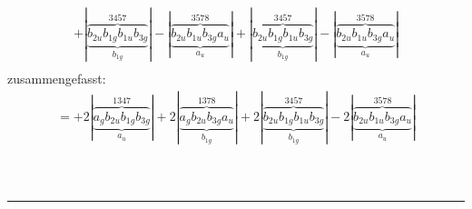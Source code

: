 \documentclass{article}
\begin{document}
\begin{multline*}
+\left|\underbrace{\overbrace{b_{2u} b_{1g} b_{1u} b_{3g}}^{3 4 5 7}}_{b_{1g}}\right|-\left|\underbrace{\overbrace{b_{2u} b_{1u} b_{3g} a_{u}}^{3 5 7 8}}_{a_{u}}\right|+\left|\underbrace{\overbrace{b_{2u} b_{1g} b_{1u} b_{3g}}^{3 4 5 7}}_{b_{1g}}\right|-\left|\underbrace{\overbrace{b_{2u} b_{1u} b_{3g} a_{u}}^{3 5 7 8}}_{a_{u}}\right|\\
\end{multline*}zusammengefasst:\begin{multline*}
=+2\left|\underbrace{\overbrace{a_{g} b_{2u} b_{1g} b_{3g}}^{1 3 4 7}}_{a_{u}}\right|+2\left|\underbrace{\overbrace{a_{g} b_{2u} b_{3g} a_{u}}^{1 3 7 8}}_{b_{1g}}\right|+2\left|\underbrace{\overbrace{b_{2u} b_{1g} b_{1u} b_{3g}}^{3 4 5 7}}_{b_{1g}}\right|-2\left|\underbrace{\overbrace{b_{2u} b_{1u} b_{3g} a_{u}}^{3 5 7 8}}_{a_{u}}\right|\\
\end{multline*}\\ \\
\hrule\newpage 
\end{document}
